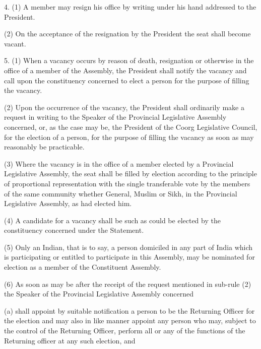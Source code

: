 4. (1) A member may resign his office by writing under his hand addressed to the President.



(2) On the acceptance of the resignation by the President the seat shall become vacant.



5. (1) When a vacancy occurs by reason of death, resignation or otherwise in the office of a member of the Assembly, the President shall notify the vacancy and call upon the constituency concerned to elect a person for the purpose of filling the vacancy.



(2) Upon the occurrence of the vacancy, the President shall ordinarily make a request in writing to the Speaker of the Provincial Legislative Assembly concerned, or, as the case may be, the President of the Coorg Legislative Council, for the election of a person, for the purpose of filling the vacancy as soon as may reasonably be practicable.



(3) Where the vacancy is in the office of a member elected by a Provincial Legislative Assembly, the seat shall be filled by election according to the principle of proportional representation with the single transferable vote by the members of the same community whether General, Muslim or Sikh, in the Provincial Legislative Assembly, as had elected him.



(4) A candidate for a vacancy shall be such as could be elected by the constituency concerned under the Statement.



(5) Only an Indian, that is to say, a person domiciled in any part of India which is participating or entitled to participate in this Assembly, may be nominated for election as a member of the Constituent Assembly.



(6) As soon as may be after the receipt of the request mentioned in sub-rule (2) the Speaker of the Provincial Legislative Assembly concerned\textemdash{}



(a) shall appoint by suitable notification a person to be the Returning Officer for the election and may also in like manner appoint any person who may, subject to the control of the Returning Officer, perform all or any of the functions of the Returning officer at any such election, and



